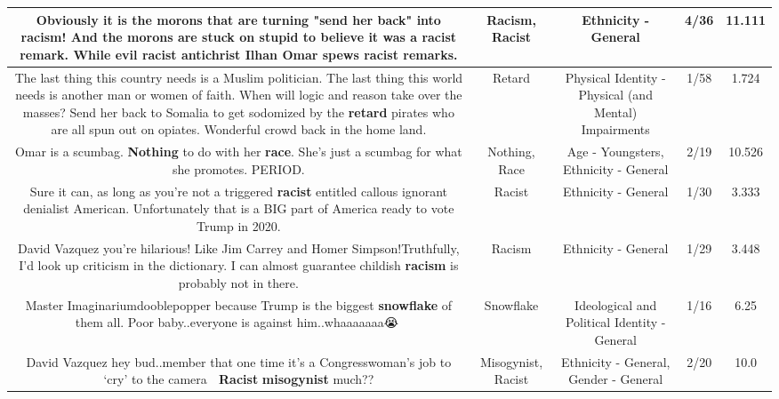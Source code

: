 \documentclass[11pt]{article}
\newlength\mylength
\begin{document}
\begin{center}
\begin{longtable}{|C{.65\mylength}|C{.30\mylength}|C{.12\mylength}|C{.12\mylength}|C{.12\mylength}|}
  \small Obviously it is the morons that are turning "send her back" into \textbf{racism}!  And the morons are stuck on stupid to believe it was a \textbf{racist} remark.  While evil \textbf{racist} antichrist Ilhan Omar spews \textbf{racist} remarks.\normalsize   & Racism, Racist & Ethnicity - General & 4/36 & 11.111 \\  \hline
  \small The last thing this country needs is a Muslim politician.  The last thing this world needs is another man or women of faith. When will logic and reason take over the masses? Send her back to Somalia to get sodomized by the \textbf{retard} pirates who are all spun out on opiates. Wonderful crowd back in the home land.\normalsize   & Retard & Physical Identity - Physical (and Mental) Impairments & 1/58 & 1.724 \\  \hline
  \small Omar is a scumbag.  \textbf{Nothing} to do with her \textbf{race}. She's just a scumbag for what she promotes. PERIOD.\normalsize   & Nothing, Race & Age - Youngsters, Ethnicity - General & 2/19 & 10.526 \\  \hline
  \small Sure it can, as long as you're not a triggered \textbf{racist} entitled callous ignorant denialist American. Unfortunately that is a BIG part of America ready to vote Trump in 2020.\normalsize   & Racist & Ethnicity - General & 1/30 & 3.333 \\  \hline
  \small David Vazquez you're hilarious! Like Jim Carrey and Homer Simpson!Truthfully, I'd look up criticism in the dictionary. I can almost guarantee childish \textbf{racism} is probably not in there.\normalsize   & Racism & Ethnicity - General & 1/29 & 3.448 \\  \hline
  \small Master Imaginariumdooblepopper because Trump is the biggest \textbf{snowflake} of them all. Poor baby..everyone is against him..whaaaaaaa😭🤨\normalsize   & Snowflake &  Ideological and Political Identity - General & 1/16 & 6.25 \\  \hline
  \small David Vazquez hey bud..member that one time it's a Congresswoman's job to ‘cry' to the camera 🤨 \textbf{Racist} \textbf{misogynist} much??\normalsize   & Misogynist, Racist & Ethnicity - General, Gender - General & 2/20 & 10.0 \\  \hline

\end{longtable}
\end{center}
\end{document}
